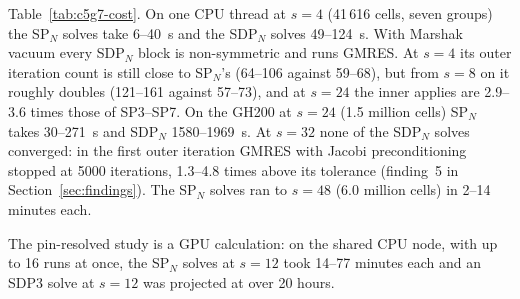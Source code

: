 Table~\ref{tab:c5g7-cost}. On one CPU thread at $s = 4$ (41\,616 cells,
seven groups) the SP$_N$ solves take 6--40~s and the SDP$_N$ solves
49--124~s. With Marshak vacuum every SDP$_N$ block is non-symmetric and runs
GMRES. At $s = 4$ its outer iteration count is still close to SP$_N$'s (64--106
against 59--68), but from $s = 8$ on it roughly doubles (121--161 against
57--73), and at $s = 24$ the inner applies are 2.9--3.6 times those of
SP3--SP7. On the
GH200 at $s = 24$ (1.5 million cells) SP$_N$ takes 30--271~s and SDP$_N$
1580--1969~s. At $s = 32$ none of the SDP$_N$ solves converged: in the first
outer iteration GMRES with Jacobi preconditioning stopped at 5000 iterations,
1.3--4.8 times above its tolerance (finding~5 in
Section~\ref{sec:findings}). The SP$_N$ solves ran to $s = 48$ (6.0 million
cells) in 2--14 minutes each.

The pin-resolved study is a GPU calculation: on the shared CPU node, with up
to 16 runs at once, the SP$_N$ solves at $s = 12$ took 14--77 minutes each and
an SDP3 solve at $s = 12$ was projected at over 20 hours.
